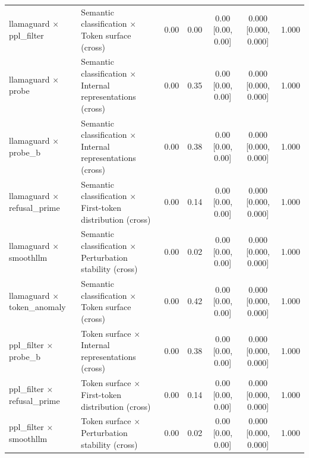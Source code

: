 \begin{tabular}{llccccc}
llamaguard $\times$ ppl_filter & Semantic classification $\times$ Token surface (cross) & 0.00 & 0.00 & 0.00 [0.00, 0.00]  & 0.000 [0.000, 0.000] & 1.000 \\
llamaguard $\times$ probe & Semantic classification $\times$ Internal representations (cross) & 0.00 & 0.35 & 0.00 [0.00, 0.00]  & 0.000 [0.000, 0.000] & 1.000 \\
llamaguard $\times$ probe_b & Semantic classification $\times$ Internal representations (cross) & 0.00 & 0.38 & 0.00 [0.00, 0.00]  & 0.000 [0.000, 0.000] & 1.000 \\
llamaguard $\times$ refusal_prime & Semantic classification $\times$ First-token distribution (cross) & 0.00 & 0.14 & 0.00 [0.00, 0.00]  & 0.000 [0.000, 0.000] & 1.000 \\
llamaguard $\times$ smoothllm & Semantic classification $\times$ Perturbation stability (cross) & 0.00 & 0.02 & 0.00 [0.00, 0.00]  & 0.000 [0.000, 0.000] & 1.000 \\
llamaguard $\times$ token_anomaly & Semantic classification $\times$ Token surface (cross) & 0.00 & 0.42 & 0.00 [0.00, 0.00]  & 0.000 [0.000, 0.000] & 1.000 \\
ppl_filter $\times$ probe_b & Token surface $\times$ Internal representations (cross) & 0.00 & 0.38 & 0.00 [0.00, 0.00]  & 0.000 [0.000, 0.000] & 1.000 \\
ppl_filter $\times$ refusal_prime & Token surface $\times$ First-token distribution (cross) & 0.00 & 0.14 & 0.00 [0.00, 0.00]  & 0.000 [0.000, 0.000] & 1.000 \\
ppl_filter $\times$ smoothllm & Token surface $\times$ Perturbation stability (cross) & 0.00 & 0.02 & 0.00 [0.00, 0.00]  & 0.000 [0.000, 0.000] & 1.000 \\
\bottomrule
\end{tabular}